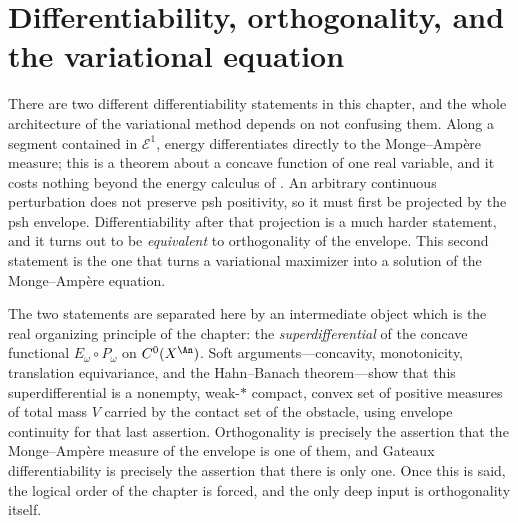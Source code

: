 \chapter{Differentiability, orthogonality, and the variational equation}
\label{chap:bfj-differentiability}

There are two different differentiability statements in this chapter, and the
whole architecture of the variational method depends on not confusing them.
Along a segment contained in $\mathcal E^1$, energy differentiates directly
to the Monge--Amp\`ere measure; this is a theorem about a concave function of
one real variable, and it costs nothing beyond the energy calculus of
.  An arbitrary continuous perturbation does not
preserve psh positivity, so it must first be projected by the psh envelope.
Differentiability after that projection is a much harder statement, and it
turns out to be \emph{equivalent} to orthogonality of the envelope.  This
second statement is the one that turns a variational maximizer into a
solution of the Monge--Amp\`ere equation.

The two statements are separated here by an intermediate object which is the
real organizing principle of the chapter: the \emph{superdifferential} of the
concave functional $E_\omega\circ P_\omega$ on $C^0(X^{\An})$.  Soft
arguments---concavity, monotonicity, translation equivariance, and the
Hahn--Banach theorem---show that this superdifferential is a nonempty,
weak-$*$ compact, convex set of positive measures of total mass $V$
carried by the contact set of the obstacle, using envelope continuity for
that last assertion.  Orthogonality is precisely the
assertion that the Monge--Amp\`ere measure of the envelope is one of them,
and Gateaux differentiability is precisely the assertion that there is only
one.  Once this is said, the logical order of the chapter is forced, and the
only deep input is orthogonality itself.

